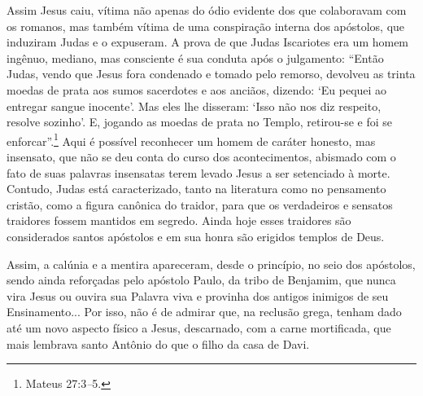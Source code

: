 Assim Jesus caiu, vítima não apenas do ódio evidente dos que colaboravam
com os romanos, mas também vítima de uma conspiração interna dos
apóstolos, que induziram Judas e o expuseram. A prova de que Judas
Iscariotes era um homem ingênuo, mediano, mas consciente é sua conduta
após o julgamento: ``Então Judas, vendo que Jesus fora condenado e
tomado pelo remorso, devolveu as trinta moedas de prata aos sumos
sacerdotes e aos anciãos, dizendo: `Eu pequei ao entregar sangue
inocente'. Mas eles lhe disseram: `Isso não nos diz respeito, resolve
sozinho'. E, jogando as moedas de prata no Templo, retirou-se e foi se
enforcar''.\footnote{Mateus 27:3\emph{--}5.} Aqui é possível reconhecer
um homem de caráter honesto, mas insensato, que não se deu conta do
curso dos acontecimentos, abismado com o fato de suas palavras
insensatas terem levado Jesus a ser setenciado à morte. Contudo, Judas
está caracterizado, tanto na literatura como no pensamento cristão, como
a figura canônica do traidor, para que os verdadeiros e sensatos
traidores fossem mantidos em segredo. Ainda hoje esses traidores são
considerados santos apóstolos e em sua honra são erigidos templos de
Deus.

Assim, a calúnia e a mentira apareceram, desde o princípio, no seio dos
apóstolos, sendo ainda reforçadas pelo apóstolo Paulo, da tribo de
Benjamim, que nunca vira Jesus ou ouvira sua Palavra viva e provinha dos
antigos inimigos de seu Ensinamento... Por isso, não é de admirar que,
na reclusão grega, tenham dado até um novo aspecto físico a Jesus,
descarnado, com a carne mortificada, que mais lembrava santo Antônio do
que o filho da casa de Davi.

